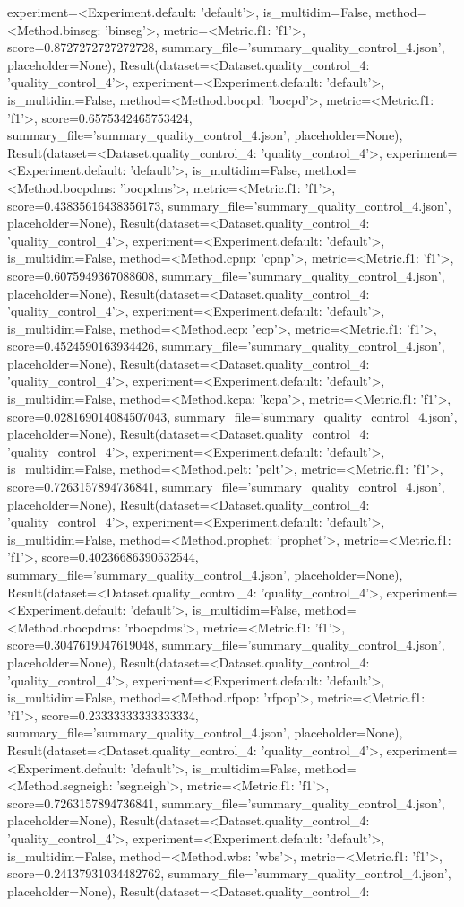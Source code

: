 experiment=<Experiment.default: 'default'>, is_multidim=False, method=<Method.binseg: 'binseg'>, metric=<Metric.f1: 'f1'>, score=0.8727272727272728, summary_file='summary_quality_control_4.json', placeholder=None), Result(dataset=<Dataset.quality_control_4: 'quality_control_4'>, experiment=<Experiment.default: 'default'>, is_multidim=False, method=<Method.bocpd: 'bocpd'>, metric=<Metric.f1: 'f1'>, score=0.6575342465753424, summary_file='summary_quality_control_4.json', placeholder=None), Result(dataset=<Dataset.quality_control_4: 'quality_control_4'>, experiment=<Experiment.default: 'default'>, is_multidim=False, method=<Method.bocpdms: 'bocpdms'>, metric=<Metric.f1: 'f1'>, score=0.43835616438356173, summary_file='summary_quality_control_4.json', placeholder=None), Result(dataset=<Dataset.quality_control_4: 'quality_control_4'>, experiment=<Experiment.default: 'default'>, is_multidim=False, method=<Method.cpnp: 'cpnp'>, metric=<Metric.f1: 'f1'>, score=0.6075949367088608, summary_file='summary_quality_control_4.json', placeholder=None), Result(dataset=<Dataset.quality_control_4: 'quality_control_4'>, experiment=<Experiment.default: 'default'>, is_multidim=False, method=<Method.ecp: 'ecp'>, metric=<Metric.f1: 'f1'>, score=0.4524590163934426, summary_file='summary_quality_control_4.json', placeholder=None), Result(dataset=<Dataset.quality_control_4: 'quality_control_4'>, experiment=<Experiment.default: 'default'>, is_multidim=False, method=<Method.kcpa: 'kcpa'>, metric=<Metric.f1: 'f1'>, score=0.028169014084507043, summary_file='summary_quality_control_4.json', placeholder=None), Result(dataset=<Dataset.quality_control_4: 'quality_control_4'>, experiment=<Experiment.default: 'default'>, is_multidim=False, method=<Method.pelt: 'pelt'>, metric=<Metric.f1: 'f1'>, score=0.7263157894736841, summary_file='summary_quality_control_4.json', placeholder=None), Result(dataset=<Dataset.quality_control_4: 'quality_control_4'>, experiment=<Experiment.default: 'default'>, is_multidim=False, method=<Method.prophet: 'prophet'>, metric=<Metric.f1: 'f1'>, score=0.40236686390532544, summary_file='summary_quality_control_4.json', placeholder=None), Result(dataset=<Dataset.quality_control_4: 'quality_control_4'>, experiment=<Experiment.default: 'default'>, is_multidim=False, method=<Method.rbocpdms: 'rbocpdms'>, metric=<Metric.f1: 'f1'>, score=0.3047619047619048, summary_file='summary_quality_control_4.json', placeholder=None), Result(dataset=<Dataset.quality_control_4: 'quality_control_4'>, experiment=<Experiment.default: 'default'>, is_multidim=False, method=<Method.rfpop: 'rfpop'>, metric=<Metric.f1: 'f1'>, score=0.23333333333333334, summary_file='summary_quality_control_4.json', placeholder=None), Result(dataset=<Dataset.quality_control_4: 'quality_control_4'>, experiment=<Experiment.default: 'default'>, is_multidim=False, method=<Method.segneigh: 'segneigh'>, metric=<Metric.f1: 'f1'>, score=0.7263157894736841, summary_file='summary_quality_control_4.json', placeholder=None), Result(dataset=<Dataset.quality_control_4: 'quality_control_4'>, experiment=<Experiment.default: 'default'>, is_multidim=False, method=<Method.wbs: 'wbs'>, metric=<Metric.f1: 'f1'>, score=0.24137931034482762, summary_file='summary_quality_control_4.json', placeholder=None), Result(dataset=<Dataset.quality_control_4: 